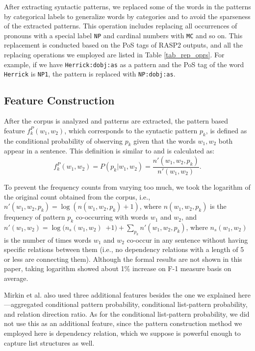 \documentclass[english]{jnlp_1.4}
\begin{document}
After extracting syntactic patterns, we replaced some of the words in
the patterns by categorical labels to generalize words by categories
and to avoid the sparseness of the extracted patterns. This operation
includes replacing all occurrences of pronouns with a special label
{\tt NP} and cardinal numbers with {\tt MC} and so on. This
replacement is conducted based on the PoS tags of RASP2 outputs, and
all the replacing operations we employed are listed in Table
\ref{tab_rep_oprs}. For example, if we have {\tt Herrick:dobj:as} as a
pattern and the PoS tag of the word {\tt Herrick} is {\tt NP1}, the
pattern is replaced with {\tt NP:dobj:as}.


\subsection{Feature Construction}

After the corpus is analyzed and patterns are extracted, the pattern
based feature $f^P_k(w_1, w_2)$, which corresponds to the syntactic
pattern $p_k$, is defined as the conditional probability of observing
$p_k$ given that the words $w_1, w_2$ both appear in a sentence. This
definition is similar to \cite{Mirkin:06} and is calculated as:
\begin{equation}
  f^P_k(w_1, w_2) = P(p_k | w_1, w_2) = \frac{n'(w_1, w_2, p_k)}{n'(w_1, w_2)}.
\end{equation}

To prevent the frequency counts from varying too much, we took the
logarithm of the original count obtained from the corpus, i.e.,
$n'(w_1, w_2, p_k) = \log\left(n(w_1, w_2, p_k) + 1\right)$, where
$n(w_1, w_2, p_k)$ is the frequency of pattern $p_k$ co-occurring with
words $w_1$ and $w_2$, and $n'(w_1, w_2) = \log(n_s(w_1, w_2) $\ $+1)
+ \sum_{p_k} n'(w_1, w_2, p_k)$, where $n_s(w_1, w_2)$ is the number
of times words $w_1$ and $w_2$ co-occur in any sentence without having
specific relations between them (i.e., no dependency relations with a
length of 5 or less are connecting them). Although the formal results
are not shown in this paper, taking logarithm showed about 1\%
increase on F-1 measure basis on average.

Mirkin et al. also used three additional features besides the one we
explained here---aggregated conditional pattern probability,
conditional list-pattern probability, and relation direction ratio. As
for the conditional list-pattern probability, we did not use this as
an additional feature, since the pattern construction method we
employed here is dependency relation, which we suppose is powerful
enough to capture list structures as well.
\end{document}
